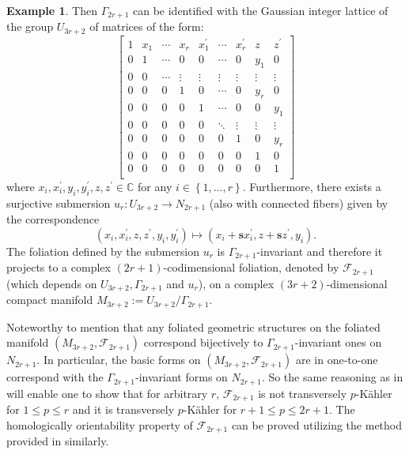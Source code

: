 \documentclass[12pt]{amsart}
\numberwithin{equation}{section}
\theoremstyle{definition}
\newtheorem{example}  [theorem]     {Example}
\theoremstyle{definition}
\theoremstyle{definition}
\renewcommand{\1}{\mathsf{1}}
\renewcommand{\>}{\rightarrow}
\def\mb{\mathbb}
\def\mc{\mathcal}
\theoremstyle{plain} %
\theoremstyle{plain} %
\theoremstyle{plain} %
\begin{document}
\begin{example}
		Then $\Gamma_{2r+1}$ can be identified with the Gaussian integer lattice of the group $U_{3r+2}$ of matrices of the form:
		\[
		\begin{bmatrix}
			1 &x_1 &\cdots& x_r&x_1^\prime &\cdots&x^\prime_r &z&z^\prime \\
			0&1&\cdots &0&0&\cdots&0&y_1&0\\
			0&0&\cdots&\vdots&\vdots&\vdots&\vdots&\vdots&\vdots \\
			0&0&0&1&0&\cdots&0&y_r&0\\
			0&0&0&0&1&\cdots&0&0&y_1\\
			0& 	0&	0&	0&	0&\ddots&\vdots&\vdots&\vdots\\
			0&	0&	0&	0&	0&	0&1&	0&y_r\\
			0&	0&	0&	0&	0&	0&	0&1&	0\\
			0&	0&	0&	0&	0&	0&	0&	0& 1\\
		\end{bmatrix}
		\]
		where $x_i, x_i^\prime, y_i, y_i^\prime, z, z^\prime \in\mb C$ for any $i\in\left\{1,\ldots,r\right\}$. Furthermore, there exists a surjective submersion $u_r:U_{3r+2}\rightarrow N_{2r+1}$ (also with connected fibers) given by the correspondence
		$$\left(x_i,x_i^\prime,z,z^\prime, y_i,y_i^\prime\right)\longmapsto\left(x_i+\boldsymbol{s}x_i^\prime,z+\boldsymbol{s}z^\prime,y_i\right).$$ The foliation defined by the submersion $u_r$ is $\Gamma_{2r+1}$-invariant and therefore it projects to a complex $(2r+1)$-codimensional foliation,
		denoted by  $\mathcal{F}_{2r+1}$ (which
		depends on $U_{3r+2}, \Gamma_{2r+1}$ and $u_r$),  on a complex $(3r+2)$-dimensional compact manifold $M_{3r+2}:=U_{3r+2}/\Gamma_{2r+1}$. 
        
Noteworthy to mention that any foliated geometric structures on the foliated manifold $(M_{3r+2}, \mc F_{2r+1})$ correspond bijectively to $\Gamma_{2r+1}$-invariant ones on $N_{2r+1}$. In particular, the basic forms on $(M_{3r+2}, \mc F_{2r+1})$ are in one-to-one correspond with the $\Gamma_{2r+1}$-invariant forms on $N_{2r+1}$.  So the same reasoning  as in \cite[Section 4]{AB91} will enable one to show that for arbitrary $r$, $\mc F_{2r+1}$ is not transversely $p$-K\"ahler for $1\leq p\leq r$ and it is transversely $p$-K\"ahler for $r+1\leq p\leq {2r+1}$. The homologically orientability property of $\mc F_{2r+1}$ can be proved utilizing the method provided in \cite[p. 182]{CW91} similarly.
	\end{example}
	
	
	
	
\end{document}
